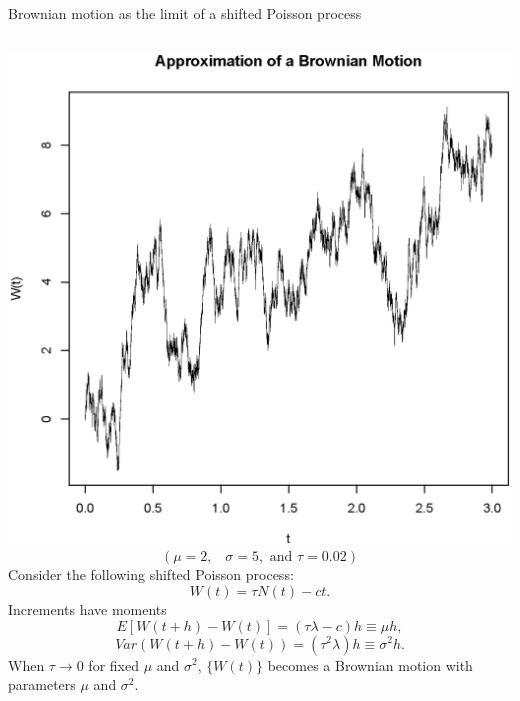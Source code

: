 \documentclass[11pt]{beamer}
\begin{document}
\begin{frame}{Brownian motion as the limit of a shifted Poisson process}
\begin{columns}
\includegraphics[width=\textwidth,bb=0 0 492 492]{exampleB2}
\vspace{-0.3cm}
{\small $$(\mu=2,\;\;\;\sigma=5,\text{ and }\tau=0.02)$$}
Consider the following shifted Poisson process:
$$W(t)=\tau N(t) -ct.$$
Increments have moments
$$E[W(t+h)-W(t)]=(\tau \lambda -c)h \equiv \mu h,$$
$$Var(W(t+h)-W(t))=(\tau^2 \lambda)h \equiv \sigma^2 h.
$$
When $\tau \rightarrow 0$ for fixed $\mu$ and $\sigma^2$, $\{W(t)\}$ becomes a Brownian motion with parameters $\mu$ and $\sigma^2$.
\vspace{.2cm}
\end{columns}
\end{frame}
\end{document}
